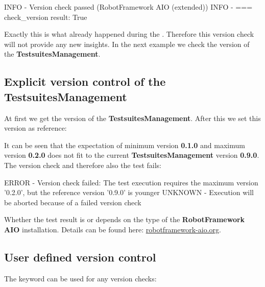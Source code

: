 \begin{robotlog}
INFO - Version check passed (RobotFramework AIO (extended))
INFO - === check_version result: True
\end{robotlog}

Exactly this is what already happened during the . Therefore this version check will not provide any new insights.
In the next example we check the version of the \textbf{TestsuitesManagement}.

\newpage

\subsection{Explicit version control of the TestsuitesManagement}

At first we get the version of the \textbf{TestsuitesManagement}. After this we set this version as reference:


It can be seen that the expectation of minimum version \textbf{0.1.0} and maximum version \textbf{0.2.0} does not fit
to the current \textbf{TestsuitesManagement} version \textbf{0.9.0}. The version check and therefore also the test fails:

\begin{robotlog}
ERROR - Version check failed: The test execution requires the maximum version '0.2.0', but the reference version '0.9.0' is younger
UNKNOWN - Execution will be aborted because of a failed version check
\end{robotlog}

Whether the test result is  or  depends on the type of the \textbf{RobotFramework AIO} installation.
Details can be found here: \href{https://robotframework-aio.org/}{robotframework-aio.org}.

\subsection{User defined version control}

The keyword  can be used for any version checks:

